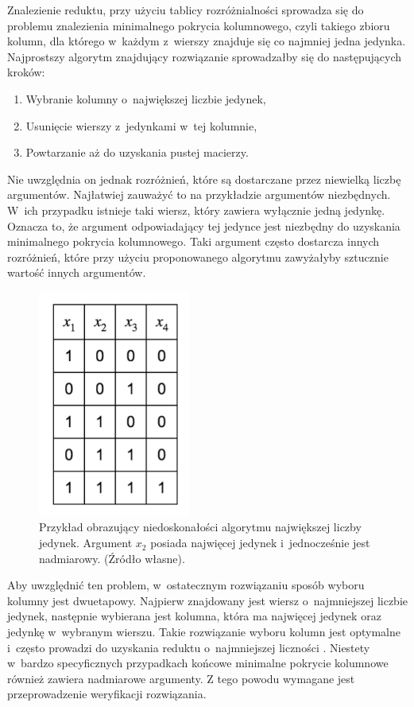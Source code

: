 Znalezienie reduktu,
przy użyciu tablicy rozróżnialności sprowadza się do problemu znalezienia minimalnego pokrycia kolumnowego,
czyli takiego zbioru kolumn,
dla którego w~każdym z~wierszy znajduje się co najmniej jedna jedynka.
Najprostszy algorytm znajdujący rozwiązanie sprowadzałby się do następujących kroków:
\begin{enumerate}
\item Wybranie kolumny o~największej liczbie jedynek,
\item Usunięcie wierszy z~jedynkami w~tej kolumnie,
\item Powtarzanie aż do uzyskania pustej macierzy.
\end{enumerate}
Nie uwzględnia on jednak rozróżnień,
które są dostarczane przez niewielką liczbę argumentów.
Najłatwiej zauważyć to na przykładzie argumentów niezbędnych.
W~ich przypadku istnieje taki wiersz,
który zawiera wyłącznie jedną jedynkę.
Oznacza to,
że argument odpowiadający tej jedynce jest niezbędny do uzyskania minimalnego pokrycia kolumnowego.
Taki argument często dostarcza innych rozróżnień,
które przy użyciu proponowanego algorytmu zawyżałyby sztucznie wartość innych argumentów.

\begin{figure}[H]
\centering
\includegraphics[width = 5cm]{chapter02/required-arguments.png}
\caption{Przykład obrazujący niedoskonałości algorytmu największej liczby jedynek.
Argument $x_2$ posiada najwięcej jedynek i~jednocześnie jest nadmiarowy. (Źródło własne).}
\end{figure}

Aby uwzględnić ten problem,
w~ostatecznym rozwiązaniu sposób wyboru kolumny jest dwuetapowy.
Najpierw znajdowany jest wiersz o~najmniejszej liczbie jedynek,
następnie wybierana jest kolumna,
która ma najwięcej jedynek oraz jedynkę w~wybranym wierszu.
Takie rozwiązanie wyboru kolumn jest optymalne i~często prowadzi do uzyskania reduktu o~najmniejszej liczności \cite{unate-artykul}.
Niestety w~bardzo specyficznych przypadkach końcowe minimalne pokrycie kolumnowe również zawiera nadmiarowe argumenty.
Z tego powodu wymagane jest przeprowadzenie weryfikacji rozwiązania.


